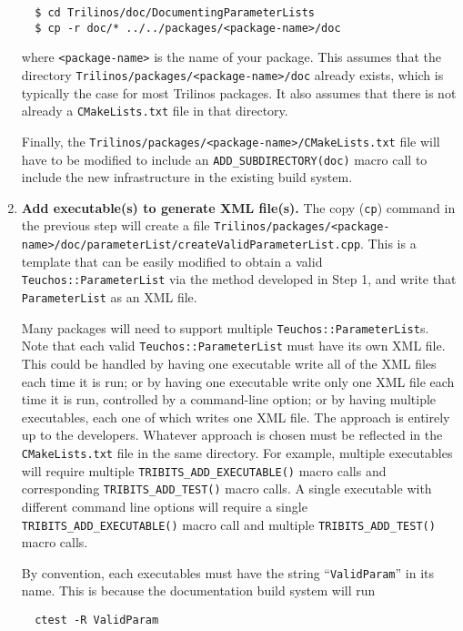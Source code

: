 \documentclass[pdf,ps2pdf,12pt]{smemo}
\begin{document}
\begin{memo}
\begin{enumerate}
 \begin{verbatim}
  $ cd Trilinos/doc/DocumentingParameterLists
  $ cp -r doc/* ../../packages/<package-name>/doc
 \end{verbatim}

  where \texttt{<package-name>} is the name of your package. This
  assumes that the directory
  \texttt{Trilinos/packages/<package-name>/doc} already exists, which
  is typically the case for most Trilinos packages.  It also assumes
  that there is not already a \texttt{CMakeLists.txt} file in that
  directory.

  Finally, the
  \texttt{Trilinos/packages/<package-name>/CMakeLists.txt} file will
  have to be modified to include an \texttt{ADD\_SUBDIRECTORY(doc)}
  macro call to include the new infrastructure in the existing build
  system.

\item \textbf{Add executable(s) to generate XML file(s).} The copy
  (\texttt{cp}) command in the previous step will create a file
  \texttt{Trilinos/packages/<package-name>/doc/parameter\-List/\-create\-Valid\-Parameter\-List.cpp}.
  This is a template that can be easily modified to obtain a valid
  \texttt{Teuchos::ParameterList} via the method developed in Step 1,
  and write that \texttt{ParameterList} as an XML file.

  Many packages will need to support multiple
  \texttt{Teuchos::ParameterList}s.  Note that each valid
  \texttt{Teuchos::ParameterList} must have its own XML file.  This
  could be handled by having one executable write all of the XML files
  each time it is run; or by having one executable write only one XML
  file each time it is run, controlled by a command-line option; or by
  having multiple executables, each one of which writes one XML
  file. The approach is entirely up to the developers.  Whatever
  approach is chosen must be reflected in the \texttt{CMakeLists.txt}
  file in the same directory. For example, multiple executables will
  require multiple \texttt{TRIBITS\_ADD\_EXECUTABLE()} macro calls and
  corresponding \texttt{TRIBITS\_ADD\_TEST()} macro calls.  A single
  executable with different command line options will require a single
  \texttt{TRIBITS\_ADD\_EXECUTABLE()} macro call and multiple
  \texttt{TRIBITS\_ADD\_TEST()} macro calls.

  By convention, each executables must have the string
  ``\texttt{ValidParam}'' in its name.  This is because the
  documentation build system will run

 \begin{verbatim}
  ctest -R ValidParam
 \end{verbatim}


\end{enumerate}
\end{memo}
\end{document}
